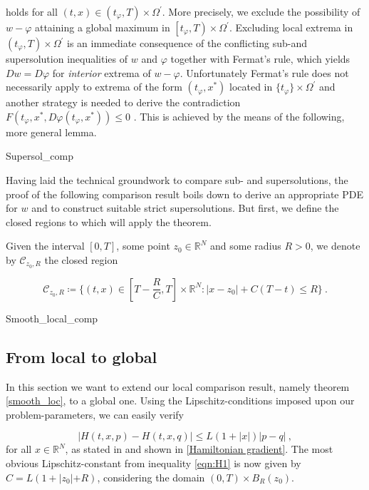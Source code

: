 		holds for all $ (t, x) \in \left( t_{\varphi}, T \right) \times\Omega^{\prime} $. More precisely, we exclude the possibility of $ w -\varphi $ attaining a global maximum in $ \left[ t_{\varphi}, T \right) \times \Omega^{\prime} $. Excluding local extrema in ${ \left( t_{\varphi}, T \right) \times \Omega^{\prime} }$ is an immediate consequence of the conflicting sub-and supersolution inequalities of $ w $ and $ \varphi $ together with Fermat's rule, which yields $ Dw = D\varphi $ for \emph{interior} extrema of $ w - \varphi $. Unfortunately Fermat's rule does not necessarily apply to extrema of the form $ (t_{\varphi}, x^{*}) $ located in $ \{t_{\varphi} \}\times \Omega^{\prime}  $ and another strategy is needed to derive the contradiction $ F(t_{\varphi}, x^{*}, D\varphi(t_\varphi, x^{*})) \leq 0 $ . This is achieved by the means of the following, more general lemma.
		
		{Supersol_comp}
	
		Having laid the technical groundwork to compare sub- and supersolutions, the proof of the following comparison result boils down to derive an appropriate PDE for $ w $ and to construct suitable strict supersolutions. But first, we define the closed regions to which will apply the theorem.
		
		\begin{definition}
			\label{regions}
			Given the interval $ \left[0, T\right] $, some point $ z_0 \in \mathbb{R}^N $ and some radius $ R > 0 $, we denote by $ \mathcal{C}_{z_0, R} $ the closed region
			
			\begin{equation*}
			\mathcal{C}_{z_0, R} \coloneqq \Bigg\{ (t, x) \in \left[ T - \frac{R}{C}, T \right] \times \mathbb{R}^N: \lvert x - z_0 \rvert + C(T-t) \leq R \Bigg\} \ .
			\end{equation*}
		\end{definition}
		
		{Smooth_local_comp}
	
	\subsection{From local to global}
		In this section we want to extend our local comparison result, namely theorem \ref{smooth_loc}, to a global one. Using the Lipschitz-conditions imposed upon our problem-parameters, we can easily verify
		
		\begin{equation}
			\label{varying_Lipschitz}
			\lvert H(t, x, p) - H(t, x, q) \rvert \leq L \left(1 + \lvert x \rvert \right) \lvert p - q \rvert \ ,
		\end{equation}
		for all $ x \in \mathbb{R}^{N} $, as stated in \cite[p.~167]{zhou} and shown in \ref{Hamiltonian gradient}. The most obvious Lipschitz-constant from inequality \eqref{eqn:H1} is now given by $ C = L (1 + \lvert z_0 \lvert + R) $, considering the domain $ \left(0, T \right) \times B_R(z_0) $.
		
